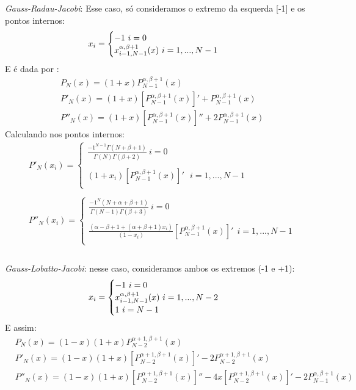 \pagebreak
 \emph{Gauss-Radau-Jacobi}: Esse caso, só consideramos o extremo da esquerda [-1] e os pontos internos:
 \begin{equation}
 x_{i}= 
\begin{cases}
 -1 \ i = 0\\
 x^{\alpha,\beta +1}_{i-1,N-1}(x) \ i= 1,...,N-1\\
\end{cases}\\
 \end{equation}
 E é dada por :
 \begin{align}
  & P_{N}(x) = (1+x)P^{\alpha,\beta+1}_{N -1}(x)\\
  & P'_{N}(x) = (1+x)[P^{\alpha,\beta+1}_{N -1}(x)]' + P^{\alpha,\beta+1}_{N -1}(x)\\
  & P''_{N}(x) = (1+x)[P^{\alpha,\beta+1}_{N -1}(x)]'' + 2P^{\alpha,\beta+1}_{N -1}(x)
 \end{align}
 Calculando nos pontos internos:
 \begin{align}
  & P'_{N}(x_i)= 
\begin{cases}
 \frac{-1^{N-1}\Gamma(N+\beta+1)}{\Gamma(N)\Gamma(\beta+2)} \ i =0\\ \\
 (1+x_i)[P^{\alpha,\beta+1}_{N -1}(x)]' \ \ \ i= 1,...,N-1\\ 
\end{cases}\\ \\
  & P''_{N}(x_i)= 
\begin{cases}
 \frac{-1^{N} (N+\alpha+\beta+1)}{\Gamma(N-1)\Gamma(\beta+3)} \ i =0\\  \\
 \frac{(\alpha -\beta +1+(\alpha+\beta+1)x_i)}{(1-x_i)}[P^{\alpha,\beta+1}_{N -1}(x)]' \ \ i= 1,...,N-1\\
\end{cases}\\
 \end{align}\\
\emph{Gauss-Lobatto-Jacobi}: nesse caso, consideramos ambos os extremos (-1 e +1):
\begin{equation}
 x_{i}= 
\begin{cases}
 -1 \ i = 0\\
 x^{\alpha,\beta +1}_{i-1,N-1}(x) \ i= 1,...,N-2\\
  1 \ i = N-1
\end{cases}\\
\end{equation}
 E assim:
 \begin{align}
  & P_{N}(x) =   (1-x)(1+x)P^{\alpha+1,\beta+1}_{N -2}(x)\\
  & P'_{N}(x) =  (1-x)(1+x)[P^{\alpha+1,\beta+1}_{N -2}(x)]' -  2P^{\alpha+1,\beta+1}_{N -2}(x)\\
  & P''_{N}(x) = (1-x)(1+x)[P^{\alpha+1,\beta+1}_{N -2}(x)]'' -4x[P^{\alpha+1,\beta+1}_{N -2}(x)]' - 2P^{\alpha,\beta+1}_{N -1}(x)
 \end{align}
